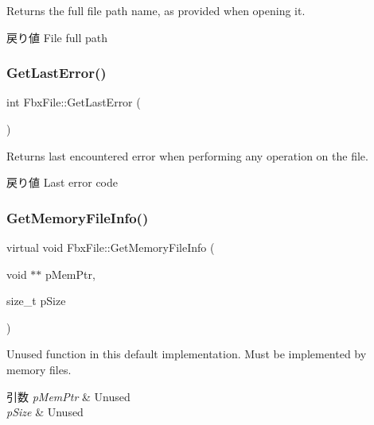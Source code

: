 Returns the full file path name, as provided when opening it. \begin{DoxyReturn}{戻り値}
File full path 
\end{DoxyReturn}
\mbox{\label{class_fbx_file_a797c6a169a44de27d96d991e884dafed}} 
\subsubsection{\texorpdfstring{Get\+Last\+Error()}{GetLastError()}}
{\footnotesize\ttfamily int Fbx\+File\+::\+Get\+Last\+Error (\begin{DoxyParamCaption}{ }\end{DoxyParamCaption})}

Returns last encountered error when performing any operation on the file. \begin{DoxyReturn}{戻り値}
Last error code 
\end{DoxyReturn}
\mbox{\label{class_fbx_file_ab603c8d30f989a0d195cc720181b18b3}} 
\subsubsection{\texorpdfstring{Get\+Memory\+File\+Info()}{GetMemoryFileInfo()}}
{\footnotesize\ttfamily virtual void Fbx\+File\+::\+Get\+Memory\+File\+Info (\begin{DoxyParamCaption}\item[{void $\ast$$\ast$}]{p\+Mem\+Ptr,  }\item[{size\+\_\+t}]{p\+Size }\end{DoxyParamCaption})\hspace{0.3cm}{\ttfamily [virtual]}}

Unused function in this default implementation. Must be implemented by memory files. 
\begin{DoxyParams}{引数}
{\em p\+Mem\+Ptr} & Unused \\
\hline
{\em p\+Size} & Unused \\
\hline
\end{DoxyParams}
\mbox{\label{class_fbx_file_aa7d93faa5ec8ef431b6c9b82845e8271}} 
